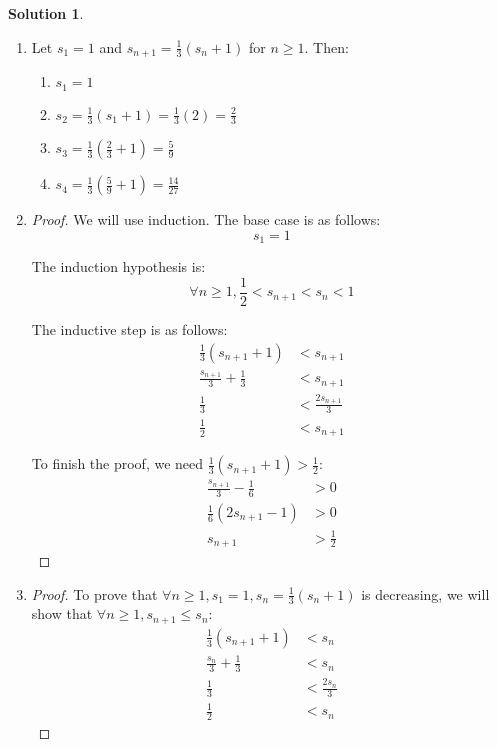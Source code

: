 \documentclass[12pt]{article}
\theoremstyle{definition} %
\newtheorem{solution}{Solution}
\theoremstyle{plain} %
\begin{document}
\begin{solution}
    \begin{enumerate}
        \item Let \(s_1 = 1\) and \(s_{n+1} = \frac{1}{3}(s_n + 1)\) for \(n \geq 1\). Then:
        \begin{enumerate}
            \item \(s_1 = 1\)
            \item \(s_2 = \frac{1}{3}(s_1 + 1) = \frac{1}{3}(2) = \frac{2}{3}\)
            \item \(s_3 = \frac{1}{3} \left( \frac{2}{3} + 1 \right) = \frac{5}{9}\)
            \item \(s_4 = \frac{1}{3} \left( \frac{5}{9} + 1 \right) = \frac{14}{27}\)
        \end{enumerate}
        \item \begin{proof}
            We will use induction. The base case is as follows:
            \[
            s_1 = 1 \tag{53}
            \]
        
            The induction hypothesis is:
            \[
            \forall n \geq 1, \frac{1}{2} < s_{n+1} < s_n < 1 \tag{54}
            \]
        
            The inductive step is as follows:
            \begin{align}
                \frac{1}{3}(s_{n+1} + 1) &< s_{n+1} \tag{55} \\
                \frac{s_{n+1}}{3} + \frac{1}{3} &< s_{n+1} \tag{56} \\
                \frac{1}{3} &< \frac{2s_{n+1}}{3} \tag{57} \\
                \frac{1}{2} &< s_{n+1} \tag{58}
            \end{align}
        
            To finish the proof, we need \(\frac{1}{3}(s_{n+1} + 1) > \frac{1}{2}\):
            \begin{align}
                \frac{s_{n+1}}{3} - \frac{1}{6} &> 0 \tag{59} \\
                \frac{1}{6}(2s_{n+1} - 1) &> 0 \tag{60} \\
                s_{n+1} &> \frac{1}{2} \tag{61}
            \end{align}
        \end{proof}
        \item \begin{proof}
            To prove that \(\forall n \geq 1, s_1 = 1, s_n = \frac{1}{3}(s_n + 1)\) is decreasing, we will show that \(\forall n \geq 1, s_{n+1} \leq s_n\):
            \begin{align}
                \frac{1}{3}(s_{n+1} + 1) &< s_n \tag{62} \\
                \frac{s_n}{3} + \frac{1}{3} &< s_n \tag{63} \\
                \frac{1}{3} &< \frac{2s_n}{3} \tag{64} \\
                \frac{1}{2} &< s_n \tag{65}
            \end{align}
        

\end{proof}
\end{enumerate}
\end{solution}
\end{document}
